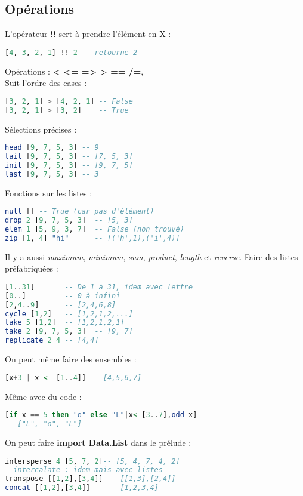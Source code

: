         \subsection{Opérations}
            L'opérateur \textbf{!!} sert à prendre l'élément en X :
            \begin{lstlisting}[language=Haskell]
[4, 3, 2, 1] !! 2 -- retourne 2
            \end{lstlisting}
            Opérations : \textbf{< <= => > == /=},\\
            Suit l'ordre des cases :
            \begin{lstlisting}[language=Haskell]
[3, 2, 1] > [4, 2, 1] -- False
[3, 2, 1] > [3, 2]    -- True
            \end{lstlisting}
            Sélections précises :
            \begin{lstlisting}[language=Haskell]
head [9, 7, 5, 3] -- 9
tail [9, 7, 5, 3] -- [7, 5, 3]
init [9, 7, 5, 3] -- [9, 7, 5]
last [9, 7, 5, 3] -- 3
            \end{lstlisting}
            Fonctions sur les listes :
            \begin{lstlisting}[language=Haskell]
null [] -- True (car pas d'élément)
drop 2 [9, 7, 5, 3]  -- [5, 3]
elem 1 [5, 9, 3, 7]  -- False (non trouvé)
zip [1, 4] "hi"      -- [('h',1),('i',4)]
            \end{lstlisting}
            Il y a aussi \textit{maximum}, \textit{minimum}, \textit{sum}, \textit{product}, \textit{length} et \textit{reverse}.
            Faire des listes préfabriquées :
            \begin{lstlisting}[language=Haskell]
[1..31]       -- De 1 à 31, idem avec lettre
[0..]         -- 0 à infini
[2,4..9]      -- [2,4,6,8]
cycle [1,2]   -- [1,2,1,2,...]
take 5 [1,2]  -- [1,2,1,2,1]
take 2 [9, 7, 5, 3]  -- [9, 7]
replicate 2 4 -- [4,4]
            \end{lstlisting}
            On peut même faire des ensembles :
            \begin{lstlisting}[language=Haskell]
[x+3 | x <- [1..4]] -- [4,5,6,7]
            \end{lstlisting}
            Même avec du code :
            \begin{lstlisting}[language=Haskell]
[if x == 5 then "o" else "L"|x<-[3..7],odd x]
-- ["L", "o", "L"]
            \end{lstlisting}
            On peut faire \textbf{import Data.List} dans le prélude :
            \begin{lstlisting}[language=Haskell]
intersperse 4 [5, 7, 2]-- [5, 4, 7, 4, 2]
--intercalate : idem mais avec listes
transpose [[1,2],[3,4]] -- [[1,3],[2,4]]
concat [[1,2],[3,4]]    -- [1,2,3,4]
            \end{lstlisting}
